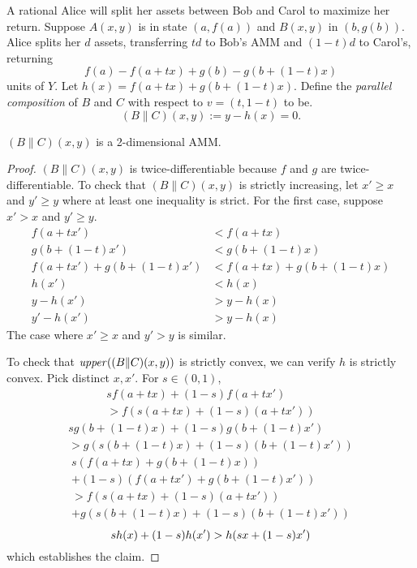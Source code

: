 A rational Alice will split her assets between
Bob and Carol to maximize her return.
Suppose $A(x,y)$ is in state $(a,f(a))$
and $B(x,y)$ in $(b,g(b))$.
Alice splits her $d$ assets,
transferring $t d$ to Bob's AMM
and $(1-t)d$ to Carol's,
returning
\begin{equation*}
  f(a) - f(a+tx) + g(b) - g(b+(1-t)x)
\end{equation*}
units of $Y$.
Let $h(x) = f(a+tx) + g(b+(1-t)x)$.
Define the \emph{parallel composition} of $B$ and $C$
with respect to $v=(t,1-t)$ to be.
\begin{equation*}
    (B\|C)(x,y) := y - h(x) = 0.
\end{equation*}
\begin{lemma}
  $(B\|C)(x,y)$ is a 2-dimensional AMM.
\end{lemma}
\begin{proof}
  $(B\|C)(x,y)$ is twice-differentiable because $f$ and $g$ are twice-differentiable.
  To check that $(B\|C)(x,y)$ is strictly increasing,
  let $x' \geq x$ and $y' \geq y$ where at least one inequality is strict.
  For the first case, suppose $x' > x$ and $y' \geq y$.
  \begin{align*}
    f(a+tx') &< f(a+tx) \\
    g(b+(1-t)x') &< g(b+(1-t)x) \\
    f(a+tx') + g(b+(1-t)x') &< f(a+tx) + g(b+(1-t)x) \\
    h(x') &< h(x) \\
    y - h(x') &> y-h(x)\\
    y' - h(x') &> y-h(x)
  \end{align*}
  The case where $x' \geq x$ and $y'> y$ is similar.

  To check that $\mathit{upper}((B\|C)(x,y))$ is strictly convex,
  we can verify $h$ is strictly convex.
  Pick distinct $x,x'$.
  For $s \in (0,1)$,
  \begin{multline*}
    s f(a+t x) + (1-s) f(a+t x')\\
    > f(s (a+t x) + (1-s) (a+t x')) 
  \end{multline*}
  \begin{multline*}
    s g(b+(1-t)x) + (1-s) g(b+(1-t)x') \\
    >g(s (b+(1-t)x) + (1-s) (b+(1-t)x'))
  \end{multline*}
  \begin{multline*}
    s (f(a+t x) + g(b+(1-t)x))\\ + (1-s)(f(a + t x')+g(b+(1-t)x'))\\
    > f(s (a + t x) + (1-s) (a + t x'))\\ + 
    g(s (b+(1-t)x) + (1-s) (b+(1-t)x'))
  \end{multline*}
  \begin{equation*}
    s h(x) + (1-s)h(x') > h(s x + (1-s)x')  \\
  \end{equation*}
  which establishes the claim.
\end{proof}

